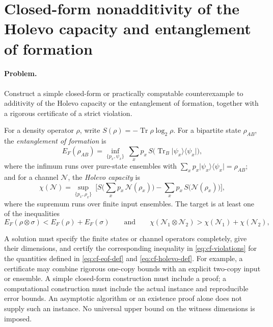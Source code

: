 \section{Closed-form nonadditivity of the Holevo capacity and entanglement of formation}
\label{sec:op_25e23d6e92ebce9d}

\paragraph{Problem.}
Construct a simple closed-form or practically computable counterexample to additivity of the Holevo capacity or the entanglement of formation, together with a rigorous certificate of a strict violation.

For a density operator $\rho$, write $S(\rho)=-\operatorname{Tr}\rho\log_2\rho$. For a bipartite state $\rho_{AB}$, the \emph{entanglement of formation} is
\begin{equation}
  E_F(\rho_{AB})=\inf_{\{p_x,\psi_x\}}\ \sum_x p_x\, S\big(\operatorname{Tr}_B\lvert\psi_x\rangle\!\langle\psi_x\rvert\big),
  \label{eq:cf-eof-def}
\end{equation}
where the infimum runs over pure-state ensembles with $\sum_x p_x\lvert\psi_x\rangle\!\langle\psi_x\rvert=\rho_{AB}$; and for a channel $\mathcal N$, the \emph{Holevo capacity} is
\begin{equation}
  \chi(\mathcal N)=\sup_{\{p_x,\rho_x\}}\ \Big[ S\Big(\sum_x p_x\,\mathcal N(\rho_x)\Big)-\sum_x p_x\,S\big(\mathcal N(\rho_x)\big)\Big],
  \label{eq:cf-holevo-def}
\end{equation}
where the supremum runs over finite input ensembles. The target is at least one of the inequalities
\begin{equation}
  E_F(\rho\otimes\sigma)<E_F(\rho)+E_F(\sigma)
  \qquad\text{and}\qquad
  \chi(\mathcal N_1\otimes\mathcal N_2)>\chi(\mathcal N_1)+\chi(\mathcal N_2),
  \label{eq:cf-violations}
\end{equation}

A solution must specify the finite states or channel operators completely, give their dimensions, and certify the corresponding inequality in \eqref{eq:cf-violations} for the quantities defined in \eqref{eq:cf-eof-def} and \eqref{eq:cf-holevo-def}. For example, a certificate may combine rigorous one-copy bounds with an explicit two-copy input or ensemble. A simple closed-form construction must include a proof; a computational construction must include the actual instance and reproducible error bounds. An asymptotic algorithm or an existence proof alone does not supply such an instance. No universal upper bound on the witness dimensions is imposed.

